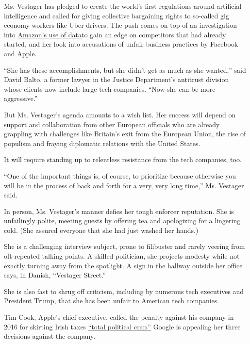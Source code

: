 Ms. Vestager has pledged to create the world's first regulations around
artificial intelligence and called for giving collective bargaining
rights to so-called gig economy workers like Uber drivers. The push
comes on top of an investigation into
\href{https://www.nytimes3xbfgragh.onion/2019/07/17/technology/amazon-eu.html}{Amazon's
use of data}to gain an edge on competitors that had already started, and
her look into accusations of unfair business practices by Facebook and
Apple.

``She has these accomplishments, but she didn't get as much as she
wanted,'' said David Balto, a former lawyer in the Justice Department's
antitrust division whose clients now include large tech companies. ``Now
she can be more aggressive.''

But Ms. Vestager's agenda amounts to a wish list. Her success will
depend on support and collaboration from other European officials who
are already grappling with challenges like Britain's exit from the
European Union, the rise of populism and fraying diplomatic relations
with the United States.

It will require standing up to relentless resistance from the tech
companies, too.

``One of the important things is, of course, to prioritize because
otherwise you will be in the process of back and forth for a very, very
long time,'' Ms. Vestager said.

In person, Ms. Vestager's manner defies her tough enforcer reputation.
She is unfailingly polite, meeting guests by offering tea and
apologizing for a lingering cold. (She assured everyone that she had
just washed her hands.)

She is a challenging interview subject, prone to filibuster and rarely
veering from oft-repeated talking points. A skilled politician, she
projects modesty while not exactly turning away from the spotlight. A
sign in the hallway outside her office says, in Danish, ``Vestager
Street.''

She is also fast to shrug off criticism, including by numerous tech
executives and President Trump, that she has been unfair to American
tech companies.

Tim Cook, Apple's chief executive, called the penalty against his
company in 2016 for skirting Irish taxes
\href{https://www.independent.ie/business/irish/no-one-did-anything-wrong-here-and-ireland-is-being-picked-on-it-is-total-political-crap-apple-chief-tim-cook-35012145.html}{``total
political crap.''} Google is appealing her three decisions against the
company.

